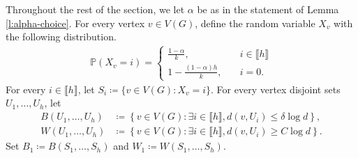 \documentclass[notitlepage]{scrartcl}
\newcommand{\br}[1]{\llbracket{#1}\rrbracket}
\renewcommand{\Pr}{\mathbb{P}}
\begin{document}
Throughout the rest of the section, we let $\alpha$ be as in the statement of Lemma \ref{l:alpha-choice}. For every vertex $v \in V(G)$, define the random variable $X_v$ with the following distribution.
\begin{align*}
    \Pr(X_v = i) = \begin{cases}
        \frac{1 - \alpha}{k}, \quad & i \in \br{h} \\
        1-\frac{(1-\alpha)h}{k}, \quad & i = 0.
    \end{cases}
\end{align*}
For every $i \in \br{h}$, let $S_i \coloneqq \{v\in V(G)\colon X_v=i\}$. For every vertex disjoint sets $U_1,\ldots, U_h$, let 
\begin{align*}
    B(U_1,\ldots, U_h)&\coloneqq \left\{v\in V(G)\colon \exists i\in \br{h}, d(v, U_i)\le \delta\log d\right\},\\
    W(U_1,\ldots, U_h)&\coloneqq \left\{v\in V(G)\colon \exists i \in \br{h}, d(v,U_i)\ge C\log d\right\}.
\end{align*}
Set $B_1\coloneqq B(S_1,\ldots, S_h)$ and $W_1\coloneqq W(S_1,\ldots, S_h)$.
\end{document}
